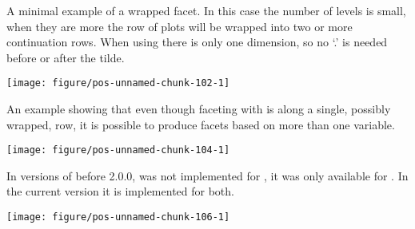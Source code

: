 \documentclass[paper=a4,headsepline,BCOR=12mm,twoside,open=right,%
titlepage,headings=small,fontsize=10pt,index=totoc,bibliography=totoc,%
captions=tableheading,captions=nooneline]{scrbook}\usepackage{knitr}
\begin{document}
A minimal example of a wrapped facet. In this case the number of levels is
small, when they are more the row of plots will be wrapped into two or more
continuation rows. When using  there is only one dimension, so no `.'
 is needed before or after the tilde.

\begin{knitrout}\footnotesize
{}\color{fgcolor}\begin{kframe}
\begin{alltt}
 \hlopt{+} \hlstd{(}\hlopt{~} 
\end{alltt}
\end{kframe}

{\centering \texttt{[image: figure/pos-unnamed-chunk-102-1]} 

}



\end{knitrout}

An example showing that even though faceting with  is along a single, possibly wrapped, row, it is possible to produce facets based on more than one variable.



\begin{knitrout}\footnotesize
{}\color{fgcolor}\begin{kframe}
\begin{alltt}
 \hlopt{+} \hlstd{(}\hlopt{~}  \hlopt{+}  \hlstd{=}\hlstd{)}
\end{alltt}
\end{kframe}

{\centering \texttt{[image: figure/pos-unnamed-chunk-104-1]} 

}



\end{knitrout}

In versions of \ggplot before 2.0.0,  was not implemented for
, it was only available for . In the current
version it is implemented for both.



\begin{knitrout}\footnotesize
{}\color{fgcolor}\begin{kframe}
\begin{alltt}
 \hlopt{+} \hlstd{(}\hlopt{~}   \hlstd{=}  \hlopt{^} 
\end{alltt}
\end{kframe}

{\centering \texttt{[image: figure/pos-unnamed-chunk-106-1]} 

}



\end{knitrout}
\end{document}
